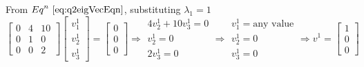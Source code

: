 \documentclass[a4paper]{article}
\begin{document}
\begin{qalist}
			From ${Eq}^{n}~\ref{eq:q2eigVecEqn}$, substituting ${\lambda}_{1} = 1$
			\begin{equation}
				\begin{bmatrix}0 & 4 & 10 \\ 0 & 1 & 0 \\ 0 & 0 & 2\end{bmatrix} 
				\begin{bmatrix}{v}^{1}_{1} \\ {v}^{1}_{2} \\ {v}^{1}_{3}\end{bmatrix} = 
				\begin{bmatrix}0 \\ 0 \\ 0\end{bmatrix}
				\Rightarrow
				\begin{array}{c}
					4{v}^{1}_{2} + 10{v}^{1}_{3} = 0 \\
					{v}^{1}_{2} = 0 \\
					2{v}^{1}_{3} = 0
				\end{array}
				\Rightarrow \begin{array}{c}{v}^{1}_{1} = \text{any value} \\ {v}^{1}_{2} = 0 \\ {v}^{1}_{3} = 0\end{array} \Rightarrow {v}^{1}= \begin{bmatrix}1 \\ 0 \\ 0\end{bmatrix}
			\end{equation}
			

\end{qalist}
\end{document}
